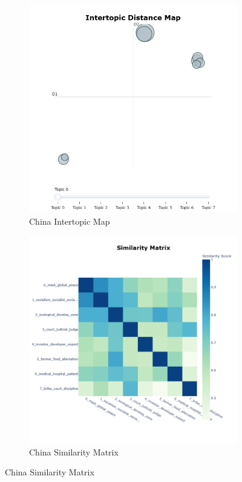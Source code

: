 \documentclass{article}
\theoremstyle{mytheoremstyle}
\theoremstyle{mytheoremstyle}
\theoremstyle{myproblemstyle}
\begin{document}
\begin{figure}[hp]
        \begin{subfigure}{0.45\textwidth}
            \includegraphics[width=\textwidth]{../images/plots/China/intertopic_distance_map_china.png}
            \caption{China Intertopic Map}
            \label{fig:intertopic_china}
        \end{subfigure}
        \hfill
        \begin{subfigure}{0.45\textwidth}
            \includegraphics[width=\textwidth]{../images/plots/China/similarity_matrix_china.png}
            \caption{China Similarity Matrix}
            \label{fig:sim_china}
        \end{subfigure}
        \hfill


\end{figure}
\end{document}
